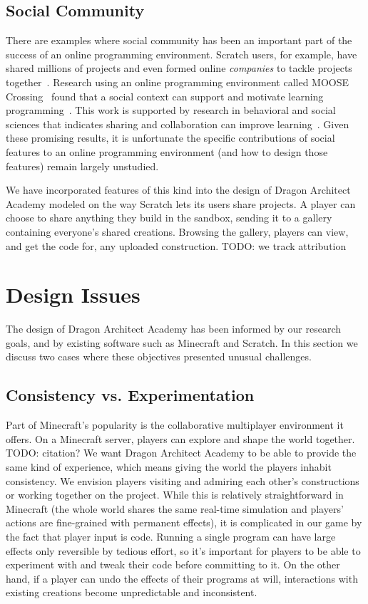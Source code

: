 \documentclass{sig-alternate}
\newcommand{\TODO}[1]{{\color{red} TODO: #1}}
\newcommand{\gametitle}{{\color{RoyalPurple} Dragon Architect Academy}}
\begin{document}
\subsection{Social Community}
There are examples where social community has been an important part of the success of an online programming environment. 
Scratch users, for example, have shared millions of projects and even formed online \emph{companies} to tackle projects together~\cite{resnick2009scratch}. 
Research using an online programming environment called MOOSE Crossing~\cite{bruckman1997moose} found that a social context can support and motivate learning programming~\cite{bruckman2000situated}.
This work is supported by research in behavioral and social sciences that indicates sharing and collaboration can improve learning~\cite{bransford2000people}. 
Given these promising results, it is unfortunate the specific contributions of social features to an online programming environment (and how to design those features) remain largely unstudied.

We have incorporated features of this kind into the design of \gametitle{} modeled on the way Scratch lets its users share projects. 
A player can choose to share anything they build in the sandbox, sending it to a gallery containing everyone's shared creations.
Browsing the gallery, players can view, and get the code for, any uploaded construction.
\TODO{we track attribution}

\section{Design Issues}
The design of \gametitle{} has been informed by our research goals, and by existing software such as Minecraft and Scratch. 
In this section we discuss two cases where these objectives presented unusual challenges. 

\subsection{Consistency vs. Experimentation}
Part of Minecraft's popularity is the collaborative multiplayer environment it offers. 
On a Minecraft server, players can explore and shape the world together. \TODO{citation?} 
We want \gametitle{} to be able to provide the same kind of experience, which means giving the world the players inhabit consistency. 
We envision players visiting and admiring each other's constructions or working together on the project. 
While this is relatively straightforward in Minecraft (the whole world shares the same real-time simulation and players' actions are fine-grained with permanent effects), it is complicated in our game by the fact that player input is code. 
Running a single program can have large effects only reversible by tedious effort, so it's important for players to be able to experiment with and tweak their code before committing to it. 
On the other hand, if a player can undo the effects of their programs at will, interactions with existing creations become unpredictable and inconsistent. 
\end{document}
